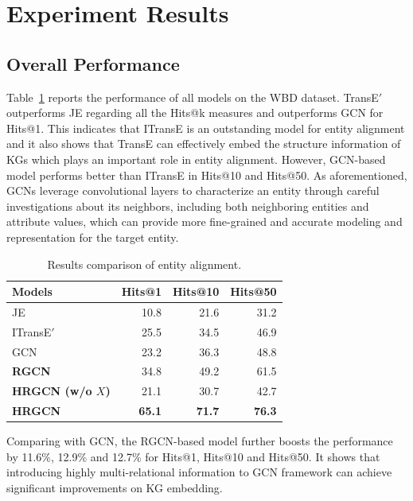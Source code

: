 


	\section{Experiment Results}
	
	
	
	\subsection{Overall Performance}
    Table~\ref{f1} reports the performance of all models on the WBD dataset. TransE$'$ outperforms JE regarding all the Hits@k measures and outperforms GCN for Hits@1. This indicates that ITransE is an
outstanding model for entity alignment and it also shows that TransE can effectively embed the structure information of KGs which plays an
important role in entity alignment. However, GCN-based model performs better than ITransE in Hits@10 and Hits@50. As aforementioned, GCNs
leverage convolutional layers to characterize an entity through careful investigations about its neighbors, including both neighboring
entities and attribute values, which can provide more fine-grained and accurate modeling and representation for the target entity.
	\begin{table}
		\centering
    \small
		\begin{tabular}{lrrr}
			\toprule
			\bf Models & Hits@1 & Hits@10 & Hits@50 \\
			\midrule
			JE & 10.8 & 21.6 & 31.2 \\
			ITransE$'$ & 25.5 & 34.5 & 46.9 \\
			GCN & 23.2 & 36.3 & 48.8 \\
			\bf RGCN & 34.8 & 49.2 & 61.5 \\
			\bf HRGCN (w/o $X$) & 21.1 & 30.7 & 42.7  \\
			\bf HRGCN & \bf 65.1 & \bf 71.7 & \bf 76.3 \\
			\bottomrule
		\end{tabular}
		\caption{Results comparison of entity alignment.}
		\label{f1}
	\end{table}
	Comparing with GCN, the RGCN-based model further boosts the performance by 11.6\%, 12.9\% and 12.7\% for Hits@1, Hits@10 and Hits@50. It shows that introducing highly multi-relational information to GCN framework can achieve significant improvements on KG embedding.
	
